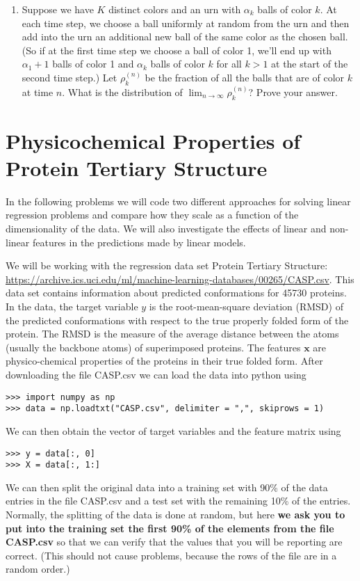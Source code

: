 \documentclass{harvardml}
\begin{document}
\begin{problem}
\begin{enumerate}[label=(\alph*)]
\item Suppose we have $K$ distinct colors and an urn with $\alpha_k$ balls of color $k$. At each time step, we choose a ball uniformly at random from the urn and then add into the urn an additional new ball of the same color as the chosen ball. (So if at the first time step we choose a ball of color 1, we'll end up with $\alpha_1+1$ balls of color 1 and $\alpha_k$ balls of color $k$ for all $k > 1$ at the start of the second time step.) Let $\rho_{k}^{(n)}$ be the fraction of all the balls that are of color $k$ at time $n$. What is the distribution of $\lim_{n \rightarrow \infty} \rho_k^{(n)}$? Prove your answer.
\end{enumerate}
\vspace{0.1cm}
\end{problem}


\newpage
\section*{Physicochemical Properties of Protein Tertiary Structure}

In the following problems we will code two different approaches for
solving linear regression problems and compare how they scale as a function of
the dimensionality of the data.  We will also investigate the effects of
linear and non-linear features in the predictions made by linear models.

We will be working with the regression data set Protein
Tertiary Structure:
\url{https://archive.ics.uci.edu/ml/machine-learning-databases/00265/CASP.csv}.
This data set contains information about predicted conformations for 45730
proteins. In the data, the target variable $y$ is the root-mean-square
deviation (RMSD) of the predicted conformations with respect to the true properly
folded form of the protein. The RMSD is the measure of the average distance
between the atoms (usually the backbone atoms) of superimposed proteins.
The features $\mathbf{x}$ are
physico-chemical properties of the proteins in their true folded form. After
downloading the file CASP.csv we can load the data into python using
\begin{verbatim}
>>> import numpy as np
>>> data = np.loadtxt("CASP.csv", delimiter = ",", skiprows = 1)
\end{verbatim}
We can then obtain the vector of target variables and the feature matrix using
\begin{verbatim}
>>> y = data[:, 0]
>>> X = data[:, 1:]
\end{verbatim}
We can then split the original data into a training set with 90\% of the data
entries in the file CASP.csv and a test set with the remaining 10\% of the
entries. Normally, the splitting of the data is done at random, but here {\bf we ask
you to put into the training set the first 90\% of the elements from the
file CASP.csv} so that we can verify that the values that you will be reporting are correct.
(This should not cause problems, because the rows of the file are in a random order.)
\end{document}
